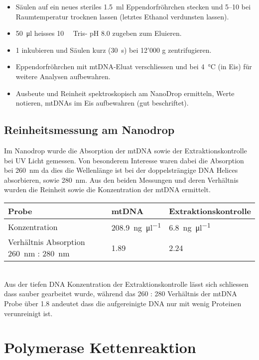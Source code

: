 \documentclass[a4paper,english]{scrreprt}
\begin{document}
\begin{itemize}
	\item Säulen auf ein neues steriles \SI{1.5}{\ml} Eppendorfröhrchen
		stecken und \SIrange{5}{10}{\min} bei Raumtemperatur trocknen
		lassen (letztes Ethanol verdunsten lassen).
	\item \SI{50}{\ul} heisses \SI{10}{\milli\Molar} Tris- pH 8.0
		zugeben zum Eluieren.
	\item \SI{1}{\min} inkubieren und Säulen kurz (\SI{30}{\s}) bei 12'000
		g zentrifugieren.
	\item Eppendorfröhrchen mit mtDNA-Eluat verschliessen und bei
		\SI{4}{\celsius} (in Eis) für weitere Analysen aufbewahren.
	\item Ausbeute und Reinheit spektroskopisch am NanoDrop ermitteln,
		Werte notieren, mtDNAs im Eis aufbewahren (gut beschriftet).
\end{itemize}

\subsection{Reinheitsmessung am Nanodrop}

Im Nanodrop wurde die Absorption der mtDNA sowie der Extraktionskontrolle bei
UV Licht gemessen. Von besonderem Interesse waren dabei die Absorption bei
\SI{260}{\nm} da dies die Wellenlänge ist bei der doppelsträngige DNA Helices
absorbieren, sowie \SI{280}{\nm}. Aus den beiden Messungen und deren Verhältnis
wurden die Reinheit sowie die Konzentration der mtDNA ermittelt.
\\

\begin{tabu}{lll}
	\toprule
	Probe & mtDNA & Extraktionskontrolle \\
	\midrule
	Konzentration & \SI{208.9}{\ng \per \ul} & \SI{6.8}{\ng \per \ul} \\
	Verhältnis Absorption \SI{260}{\nm} : \SI{280}{\nm} & 1.89 & 2.24 \\
	\bottomrule
\end{tabu}
\\

Aus der tiefen DNA Konzentration der Extraktionskontrolle lässt sich schliessen
dass sauber gearbeitet wurde, während das 260 : 280 Verhältnis der mtDNA Probe
über 1.8 andeutet dass die aufgereinigte DNA nur mit wenig Proteinen
verunreinigt ist.

\section{Polymerase Kettenreaktion}
\end{document}
